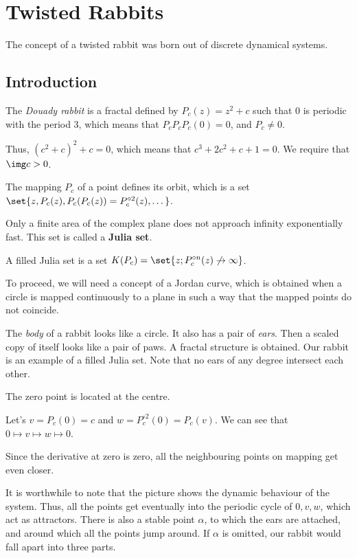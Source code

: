 \documentclass[11pt]{scrartcl}
\begin{document}
  \section{Twisted Rabbits}

  The concept of a twisted rabbit was born out of discrete dynamical systems.

  \subsection{Introduction}
  \begin{definition}
    The \textit{Douady rabbit} is a fractal defined by
    $P_{c}(z) = z^{2} + c$ such that 0 is periodic with the period 3,
    which means that $P_{c}P_{c}P_{c}(0) = 0$, and $P_{c} \neq 0$.

    Thus, $(c^{2} + c)^{2} + c = 0$, which means that
    $c^{3} + 2 c^{2} + c + 1 = 0$. We require that $\img c > 0$.
  \end{definition}

  The mapping $P_{c}$ of a point defines its orbit, which is a set
  $\set{z, P_{c}(z), P_{c}(P_{c}(z)) = P^{\circ 2}_{c}(z), \dots}$.

  Only a finite area of the complex plane does not approach infinity
  exponentially fast. This set is called a \textbf{Julia set}.

  \begin{definition}
    A filled Julia set is a set
    $K(P_{c}) = \set{z; P_{c}^{\circ n}(z)\not \to \infty}$.
  \end{definition}

  To proceed, we will need a concept of a Jordan curve, which is
  obtained when a circle is mapped continuously to a plane in such a
  way that the mapped points do not coincide.

  The \textit{body} of a rabbit looks like a circle. It also has a
  pair of \textit{ears}. Then a scaled copy of itself looks like a
  pair of paws. A fractal structure is obtained. Our rabbit is an
  example of a filled Julia set. Note that no ears of any degree
  intersect each other.

  The zero point is located at the centre.

  Let's $v = P_{c}(0) = c$ and $w = P^{\circ 2}_{c}(0) = P_{c}(v)$. We
  can see that $0\mapsto v \mapsto w \mapsto 0$.

  Since the derivative at zero is zero, all the neighbouring points
  on mapping get even closer.

  It is worthwhile to note that the picture shows the dynamic
  behaviour of the system. Thus, all the points get eventually into
  the periodic cycle of $0, v, w$, which act as attractors. There is
  also a stable point $\alpha$, to which the ears are attached, and
  around which all the points jump around. If $\alpha$ is omitted, our
  rabbit would fall apart into three parts.
\end{document}
